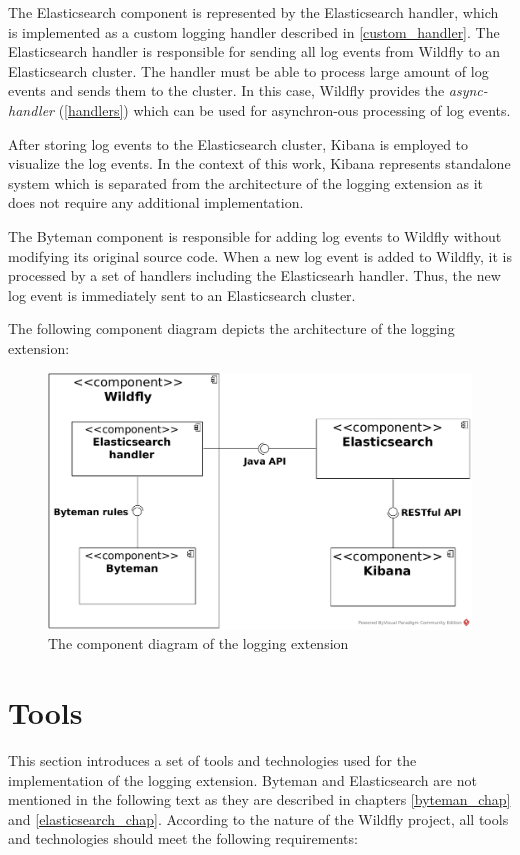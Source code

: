\documentclass[12pt,oneside]{fithesis2}
\begin{document}
The Elasticsearch component is represented by the  Elasticsearch handler, which is implemented as a custom logging handler described in \ref{custom_handler}. The Elasticsearch handler is responsible for sending all log events from Wildfly to an Elasticsearch cluster. The handler must be able to process large amount of log events and sends them to the cluster. In this case, Wildfly provides the \textit{async-handler} (\ref{handlers}) which can be used for asynchron-ous processing of log events.

After storing log events to the Elasticsearch cluster, Kibana is employed to visualize the log events. In the context of this work, Kibana represents standalone system which is separated from the architecture of the logging extension as it does not require any additional implementation.

The Byteman component is responsible for adding log events to Wildfly without modifying its original source code. When a new log event is added to Wildfly, it is processed by a set of handlers including the Elasticsearh handler. Thus, the new log event is immediately sent to an Elasticsearch cluster.

The following component diagram depicts the architecture of the logging extension:

\begin{figure}[ht!]
	\centering
	\includegraphics[width=\textwidth]{images/component_diagram}
	\caption{The component diagram of the logging extension}
	\label{component_diagram}
\end{figure}

\section{Tools}
This section introduces a set of tools and technologies used for the implementation of the logging extension. Byteman and Elasticsearch are not mentioned in the following text as they are described in chapters \ref{byteman_chap} and \ref{elasticsearch_chap}. According to the nature of the Wildfly project, all tools and technologies should meet the following requirements:
\end{document}
